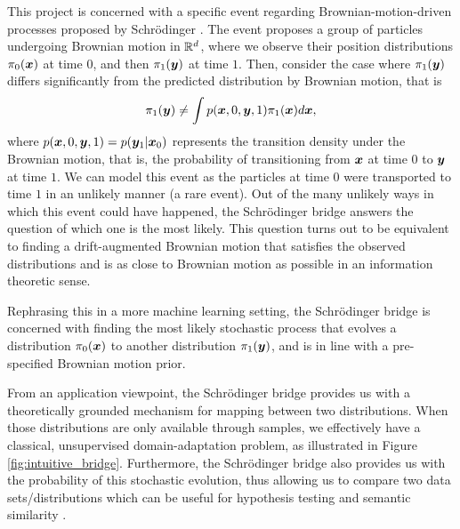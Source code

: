 \documentclass[a4paper,12pt,twoside,openright]{report}
\theoremstyle{definition}
\begin{document}
 This project is concerned with a specific event regarding Brownian-motion-driven processes proposed by Schrödinger \citep{schrodinger1931uber, schrodinger1932theorie}. The event proposes a group of particles undergoing Brownian motion in ${\mathbb{R}}^d$, where we observe their position distributions $\pi_0({\bm{x}})$ at time $0$, and then $\pi_1({\bm{y}})$ at time $1$. Then, consider the case where $\pi_1({\bm{y}})$ differs significantly from the predicted distribution by Brownian motion, that is
 \begin{align*}
     \pi_1({\bm{y}}) \neq \int p({\bm{x}}, 0, {\bm{y}} , 1) \pi_1({\bm{x}}) d{\bm{x}},
 \end{align*}
 where $p({\bm{x}}, 0, {\bm{y}} , 1) = p({\bm{y}}_1| {\bm{x}}_0)$ represents the transition density under the Brownian motion, that is, the probability of transitioning from ${\bm{x}}$ at time $0$ to ${\bm{y}}$ at time $1$. We can model this event as the particles at time $0$ were transported to time $1$ in an unlikely manner (a rare event). Out of the many unlikely ways in which this event could have happened, the Schrödinger bridge answers the question of which one is the most likely. This question turns out to be equivalent to finding a drift-augmented Brownian motion that satisfies the observed distributions and is as close to Brownian motion as possible in an information theoretic sense.
 
 Rephrasing this in a more machine learning setting, the Schrödinger bridge is concerned with finding the most likely stochastic process that evolves a distribution $\pi_0({\bm{x}})$ to another distribution $\pi_1({\bm{y}})$, and is in line with a pre-specified Brownian motion prior.
 
 From an application viewpoint, the Schrödinger bridge provides us with a theoretically grounded mechanism for mapping between two distributions. When those distributions are only available through samples, we effectively have a classical, unsupervised domain-adaptation problem, as illustrated in Figure \ref{fig:intuitive_bridge}. Furthermore, the Schrödinger bridge also provides us with the probability of this stochastic evolution, thus allowing us to compare two data sets/distributions which can be useful for hypothesis testing \citep{gretton2012kernel,ramdas2017wasserstein} and semantic similarity \citep{vargas2019model}.
 
\end{document}
